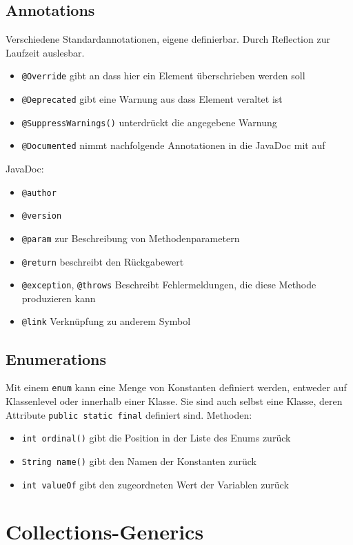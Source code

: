 \documentclass[12pt,a4]{article}
\begin{document}
	
	\subsection{Annotations}
	Verschiedene Standardannotationen, eigene definierbar. Durch Reflection zur Laufzeit auslesbar.
	\begin{itemize}
		\item \texttt{@Override} gibt an dass hier ein Element überschrieben werden soll
		\item \texttt{@Deprecated} gibt eine Warnung aus dass Element veraltet ist
		\item \texttt{@SuppressWarnings()} unterdrückt die angegebene Warnung
		\item \texttt{@Documented} nimmt nachfolgende Annotationen in die JavaDoc mit auf
	\end{itemize}
	JavaDoc:
	\begin{itemize}
		\item \texttt{@author}
		\item \texttt{@version}
		\item \texttt{@param} zur Beschreibung von Methodenparametern
		\item \texttt{@return} beschreibt den Rückgabewert
		\item \texttt{@exception}, \texttt{@throws} Beschreibt Fehlermeldungen, die diese Methode produzieren kann
		\item \texttt{@link} Verknüpfung zu anderem Symbol
	\end{itemize}
	
	\subsection{Enumerations}
	Mit einem \texttt{enum} kann eine Menge von Konstanten definiert werden, entweder auf Klassenlevel oder innerhalb einer Klasse. Sie sind auch selbst eine Klasse, deren Attribute \texttt{public static final} definiert sind. Methoden: 
	\begin{itemize}
		\item \texttt{int ordinal()} gibt die Position in der Liste des Enums zurück
		\item \texttt{String name()} gibt den Namen der Konstanten zurück
		\item \texttt{int valueOf} gibt den zugeordneten Wert der Variablen zurück 
	\end{itemize}
	
	\section{Collections-Generics}
\end{document}
